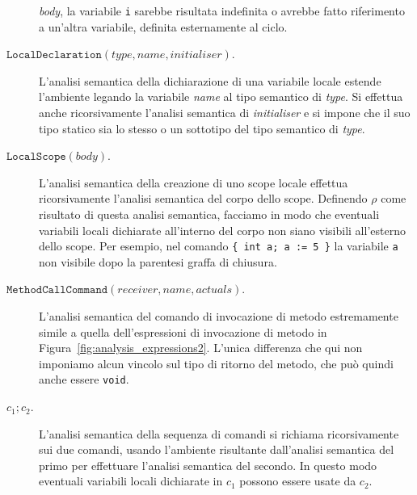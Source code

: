 \begin{description}
  \emph{body},
  la variabile \texttt{i} sarebbe risultata indefinita o avrebbe fatto
  riferimento a un'altra variabile, definita esternamente al ciclo.
\item[\underline{$\mathtt{LocalDeclaration(\mathit{type},\mathit{name},\mathit{initialiser})}$}.]
  L'analisi semantica della dichiarazione di una variabile locale estende
  l'ambiente legando la variabile \textit{name} al tipo semantico di
  \textit{type}. Si effettua anche ricorsivamente
  l'analisi semantica di \textit{initialiser} e si impone che il suo tipo
  statico sia lo stesso o un sottotipo del tipo semantico di \textit{type}.
\item[\underline{$\mathtt{LocalScope(\mathit{body})}$}.]
  L'analisi semantica della creazione di uno scope locale effettua
  ricorsivamente l'analisi semantica del corpo dello scope. Definendo
  $\rho$ come risultato di questa analisi semantica, facciamo in modo che
  eventuali variabili locali dichiarate all'interno del corpo
  non siano \piu visibili all'esterno dello scope. Per esempio, nel comando
  \verb!{ int a; a := 5 }! la variabile
  \texttt{a} non \e \piu visibile dopo la parentesi graffa di chiusura.
\item[\underline{$\mathtt{MethodCallCommand(\mathit{receiver},\mathit{name},\mathit{actuals})}$}.]
  L'analisi semantica del comando di invocazione di metodo \e
  estremamente simile a quella dell'espressioni di invocazione di metodo
  in Figura~\ref{fig:analysis_expressions2}. L'unica differenza \e che qui
  non imponiamo alcun vincolo sul tipo di ritorno del metodo, che pu\`o
  quindi anche essere \texttt{void}.
\item[\underline{$c_1;c_2$}.]
  L'analisi semantica della sequenza di comandi si richiama ricorsivamente
  sui due comandi, usando l'ambiente risultante dall'analisi semantica del
  primo per effettuare l'analisi semantica del secondo. In questo modo
  eventuali variabili locali dichiarate in $c_1$ possono essere usate da $c_2$.
\end{description}
%
